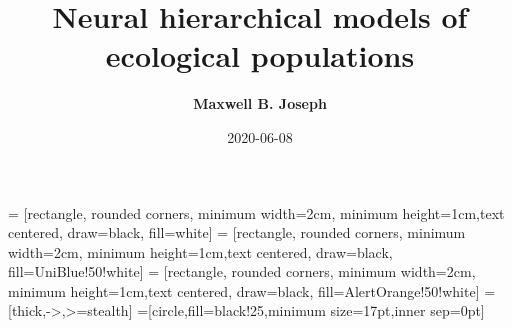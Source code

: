 \usepackage{algorithm}
\usepackage[noend]{algorithmic}
\renewcommand\algorithmicdo{:}
\renewcommand\algorithmicthen{:}
\renewcommand\algorithmicrequire{\textbf{Input:}}
\renewcommand\algorithmicensure{\textbf{Output:}}

\usepackage{tikz}
\usetikzlibrary{positioning,shapes,arrows}

\theoremstyle{definition}
\newenvironment{mythm}{\begin{alertblock}{定理}}{\end{alertblock}} %



\title{Neural hierarchical models of ecological populations}
\author{\textbf{Maxwell B. Joseph}}
\date{2020-06-08}

\usetikzlibrary{shapes.geometric, arrows}
 = [rectangle, rounded corners, minimum width=2cm, minimum height=1cm,text centered, draw=black, fill=white]
 = [rectangle, rounded corners, minimum width=2cm, minimum height=1cm,text centered, draw=black, fill=UniBlue!50!white]
 = [rectangle, rounded corners, minimum width=2cm, minimum height=1cm,text centered, draw=black, fill=AlertOrange!50!white]
 = [thick,->,>=stealth]
=[circle,fill=black!25,minimum size=17pt,inner sep=0pt]
